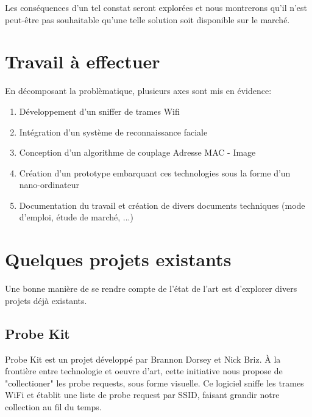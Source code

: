 Les conséquences d'un tel constat seront explorées et nous montrerons qu'il n'est peut-être pas souhaitable qu'une telle solution soit disponible sur le marché.  

\section{Travail à effectuer}

En décomposant la problèmatique, plusieurs axes sont mis en évidence:
\begin{enumerate}
\item Développement d'un sniffer de trames Wifi
\item Intégration d'un système de reconnaissance faciale
\item Conception d'un algorithme de couplage Adresse MAC - Image
\item Création d'un prototype embarquant ces technologies sous la forme d'un nano-ordinateur
\item Documentation du travail et création de divers documents techniques (mode d'emploi, étude de marché, ...)
\end{enumerate}

\section{Quelques projets existants}
Une bonne manière de se rendre compte de l'état de l'art est d'explorer divers projets déjà existants.

\subsection{Probe Kit}

Probe Kit est un projet développé par Brannon Dorsey et Nick Briz. À la frontière entre technologie et oeuvre d'art, cette initiative nous propose de "collectioner" les
probe requests, sous forme visuelle. 
Ce logiciel sniffe les trames WiFi et établit une liste de probe request par SSID, faisant grandir notre collection au fil du temps.

